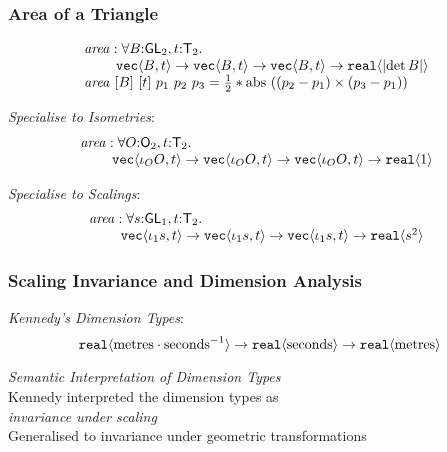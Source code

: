 \documentclass[xetex,serif,mathserif]{beamer}
\newcommand{\abs}[1]{\lvert #1 \rvert}
\newcommand{\SynGL}[1]{\mathsf{GL}_#1}
\newcommand{\SynOrth}[1]{\mathsf{O}_#1}
\newcommand{\SynTransl}[1]{\mathsf{T}_#1}
\newcommand{\tyPrim}[2]{\textup{\texttt{#1}}\langle #2 \rangle}
\newenvironment{slide}[1]{\begin{frame}\frametitle{#1}}{\end{frame}}
\begin{document}
\begin{slide}{Area of a Triangle}
  \begin{displaymath}
    \begin{array}{@{}l}
      \mathit{area} : \forall B\mathord:\SynGL{2},
      t\mathord:\SynTransl{2}.\ \\
      \hspace{0.8cm}\tyPrim{vec}{B, t} \to \tyPrim{vec}{B, t} \to
      \tyPrim{vec}{B, t} \to \tyPrim{real}{\abs{\det B}}
      \\ \mathit{area}\ [B]\ [t]\ p_1\ p_2\ p_3 = \frac{1}{2} *
      \mathrm{abs}\ ((p_2 - p_1) \times (p_3 - p_1))
    \end{array}
  \end{displaymath}
 
  \vspace{1cm}

  \pause
  \textcolor{titlered}{\emph{Specialise to Isometries}}:
  \begin{displaymath}
    \begin{array}{@{}l}
      \mathit{area} : \forall O\mathord:\SynOrth{2},
      t\mathord:\SynTransl{2}.\ \\
      \hspace{0.8cm}\tyPrim{vec}{\iota_OO, t} \to
      \tyPrim{vec}{\iota_OO, t} \to \tyPrim{vec}{\iota_OO, t} \to
      \tyPrim{real}{1}
    \end{array}
  \end{displaymath}

  \pause
  \textcolor{titlered}{\emph{Specialise to Scalings}}:
  \begin{displaymath}
    \begin{array}{@{}l}
      \mathit{area} : \forall s\mathord:\SynGL{1}, t\mathord:\SynTransl{2}.\ \\
      \hspace{0.8cm} \tyPrim{vec}{\iota_1s, t} \to \tyPrim{vec}{\iota_1s, t} \to \tyPrim{vec}{\iota_1s, t} \to \tyPrim{real}{s^2}
    \end{array}
  \end{displaymath}
\end{slide}

\begin{slide}{Scaling Invariance and Dimension Analysis}
  \textcolor{titlered}{\emph{Kennedy's Dimension Types}}:
  \begin{displaymath}
    \tyPrim{real}{\mathrm{metres} \cdot \mathrm{seconds}^{-1}} \to \tyPrim{real}{\mathrm{seconds}} \to \tyPrim{real}{\mathrm{metres}}
  \end{displaymath}

  \bigskip

  \textcolor{titlered}{\emph{Semantic Interpretation of Dimension Types}} \\
  \quad Kennedy interpreted the dimension types as \\
  \quad\hspace{5cm} \emph{invariance under scaling} \\
  \quad Generalised to invariance under geometric transformations
\end{slide}
\end{document}

